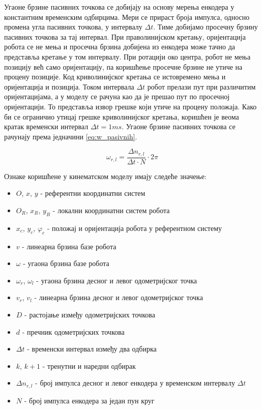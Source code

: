 \documentclass[12pt]{article}
\begin{document}
Угаоне брзине пасивних точкова се добијају на основу мерења енкодера у
константним временским одбирцима. Мери се прираст броја импулса, односно
промена угла пасивних точкова, у интервалу $\Delta t$. Тиме добијамо просечну
брзину пасивних точкова за тај интервал. При праволинијском кретању,
оријентација робота се не мења и просечна брзина добијена из енкодера може
тачно да представља кретање у том интервалу. При ротацији око центра, робот не
мења позицију већ само оријентацију, па коришћење просечне брзине не утиче на
процену позиције. Код криволинијског кретања се истовремено мења и оријентација
и позиција. Током интервала $\Delta t$ робот прелази пут при различитим
оријентацијама, а у моделу се рачуна као да је прешао пут по просечној
оријентацији. То представља извор грешке који утиче на процену положаја. Како
би се ограничио утицај грешке криволинијског кретања, коришћен је веома кратак
временски интервал $\Delta t = 1ms$. Угаоне брзине пасивних точкова се рачунају
према једначини \eqref{eq:w_pasivnih}.

\begin{equation}
	\omega_{r,l} = \dfrac{\Delta n_{r,l}}{\Delta t \cdot N} \cdot 2\pi
	\label{eq:w_pasivnih}
\end{equation}

Ознаке коришћене у кинематском моделу имају следеће значење:
\begin{itemize}
	\item $O$, $x$, $y$ - референтни координатни систем
	\item $O_R$, $x_R$, $y_R$ - локални координатни систем робота
	\item $x_c$, $y_c$, $\varphi_c$ - положај и оријентација робота у референтном систему
	\item $v$ - линеарна брзина базе робота
	\item $\omega$ - угаона брзина базе робота
	\item $\omega_r$, $\omega_l$ - угаона брзина десног и левог одометријског точка
	\item $v_r$, $v_l$ - линеарна брзина десног и левог одометријског точка
	\item $D$ - растојање између одометријских точкова
	\item $d$ - пречник одометријских точкова
	\item $\Delta t$ - временски интервал између два одбирка
	\item $k$, $k+1$ - тренутни и наредни одбирак
	\item $\Delta n_{r,l}$ - број импулса десног и левог енкодера у временском интервалу $\Delta t$
	\item $N$ - број импулса енкодера за један пун круг
\end{itemize}
\end{document}
